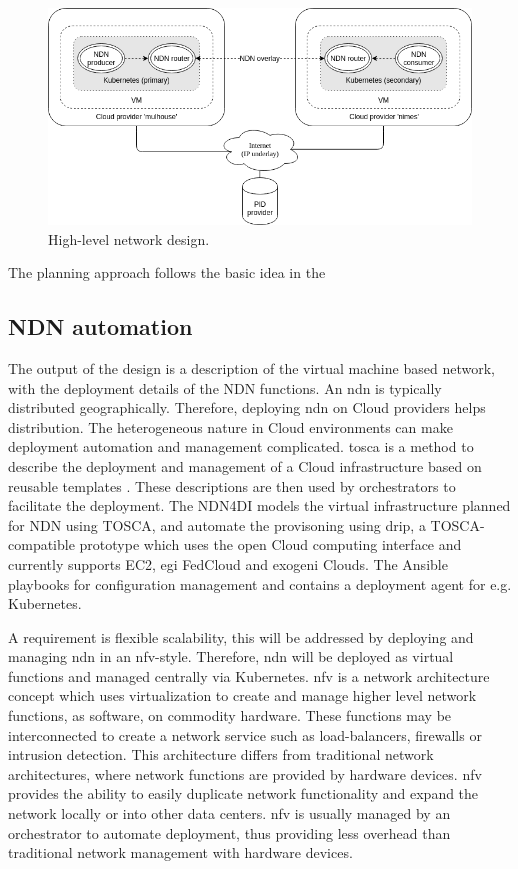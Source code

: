 \documentclass[conference]{IEEEtran}
\begin{document}
\begin{figure}[H]
\centering
\includegraphics[width=\columnwidth]{images/high-level-network-design.png}
\caption{High-level network design.}
\label{fig:high-level-network-design}
\end{figure}

The planning approach follows the basic idea in the 

\subsection{NDN automation}
The output of the design is a description of the virtual machine based network, with the deployment details of the NDN functions. 
An \gls{ndn} is typically distributed geographically. Therefore, deploying \gls{ndn} on Cloud providers helps distribution. The heterogeneous nature in Cloud environments can make deployment automation and management complicated. \gls{tosca} is a method to describe the deployment and management of a Cloud infrastructure based on reusable templates \cite{tosca-standard}. These descriptions are then used by orchestrators to facilitate the deployment. The NDN4DI models the virtual infrastructure planned for NDN using TOSCA, and automate the provisoning using \gls{drip}, a TOSCA-compatible prototype which uses the open Cloud computing interface and currently supports EC2, \gls{egi} FedCloud and \gls{exogeni} Clouds. The Ansible playbooks for configuration management and contains a deployment agent for e.g. Kubernetes. 



A requirement is flexible scalability, this will be addressed by deploying and managing \gls{ndn} in an \gls{nfv}-style. Therefore, \gls{ndn} will be deployed as virtual functions and managed centrally via Kubernetes. \gls{nfv} is a network architecture concept which uses virtualization to create and manage higher level network functions, as software, on commodity hardware. These functions may be interconnected to create a network service such as load-balancers, firewalls or intrusion detection. This architecture differs from traditional network architectures, where network functions are provided by hardware devices. \gls{nfv} provides the ability to easily duplicate network functionality and expand the network locally or into other data centers. \gls{nfv} is usually managed by an orchestrator to automate deployment, thus providing less overhead than traditional network management with hardware devices.
\end{document}
